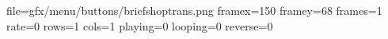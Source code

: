 file=gfx/menu/buttons/briefshoptrans.png
framex=150
framey=68
frames=1
rate=0
rows=1
cols=1
playing=0
looping=0
reverse=0